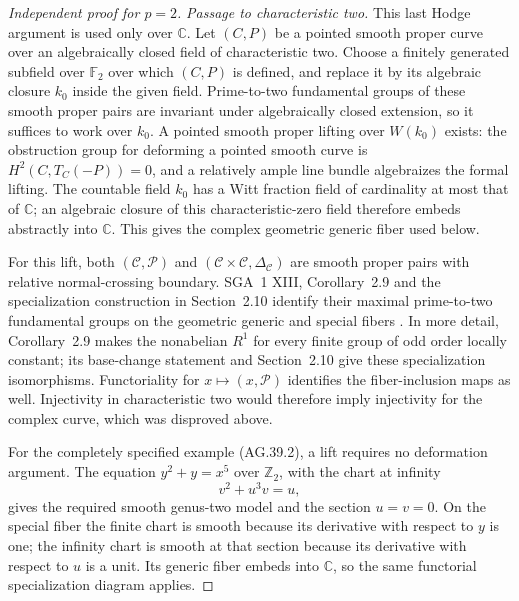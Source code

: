 \begin{proof}[Independent proof for \(p=2\)]
\emph{Passage to characteristic two.}
This last Hodge argument is used only over \(\mathbb C\).
Let \((C,P)\) be a pointed smooth proper curve over an
algebraically closed field of characteristic two. Choose a
finitely generated subfield over \(\mathbb F_2\) over which
\((C,P)\) is defined, and replace it by its algebraic closure
\(k_0\) inside the given field. Prime-to-two fundamental groups
of these smooth proper pairs are invariant under algebraically
closed extension, so it suffices to work over \(k_0\).
A pointed smooth proper lifting over \(W(k_0)\) exists: the
obstruction group for deforming a pointed smooth curve is
\(H^2(C,T_C(-P))=0\), and a relatively ample line bundle
algebraizes the formal lifting. The countable field \(k_0\)
has a Witt fraction field of cardinality at most that of
\(\mathbb C\); an algebraic closure of this characteristic-zero
field therefore embeds abstractly into \(\mathbb C\). This
gives the complex geometric generic fiber used below.

For this lift, both
\((\mathcal C,\mathcal P)\) and
\((\mathcal C\times\mathcal C,\Delta_{\mathcal C})\)
are smooth proper pairs with relative normal-crossing boundary.
SGA~1 XIII, Corollary~2.9 and the specialization construction in
Section~2.10 identify their maximal prime-to-two fundamental
groups on the geometric generic and special fibers
\cite{AR_SGA1}. In more detail, Corollary~2.9 makes the nonabelian
\(R^1\) for every finite group of odd order locally constant;
its base-change statement and Section~2.10 give these
specialization isomorphisms. Functoriality for
\(x\mapsto(x,\mathcal P)\) identifies the fiber-inclusion maps
as well. Injectivity in characteristic two would therefore imply
injectivity for the complex curve, which was disproved above.

For the completely specified example (AG.39.2), a lift requires
no deformation argument. The equation \(y^2+y=x^5\) over
\(\mathbb Z_2\), with the chart at infinity
\[
                         v^2+u^3v=u,
\]
gives the required smooth genus-two model and the section
\(u=v=0\). On the special fiber the finite chart is smooth
because its derivative with respect to \(y\) is one; the
infinity chart is smooth at that section because its derivative
with respect to \(u\) is a unit. Its generic fiber embeds into
\(\mathbb C\), so the same functorial specialization diagram
applies.
\end{proof}

